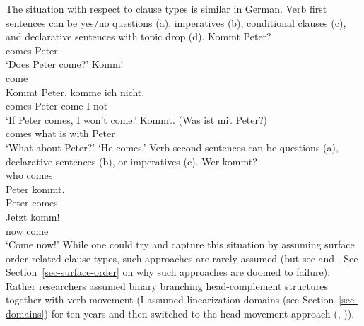 \documentclass[output=paper]{langsci/langscibook}
\begin{document}
The situation with respect to clause types is similar in German. Verb first sentences can be yes/no
questions (a), imperatives (b), conditional clauses (c), and declarative
sentences with topic drop (d). 
\eal
\ex 
\gll Kommt Peter?\\
     comes Peter\\\german
\glt `Does Peter come?'
\ex 
\gll Komm!\\
     come\\
\ex 
\gll Kommt Peter, komme ich nicht.\\
     comes Peter  come  I not\\
\glt `If Peter comes, I won't come.'
\ex 
\gll Kommt. (Was ist mit Peter?)\\
     comes  what is with Peter\\
\glt `What about Peter?' `He comes.'
\zl
Verb second sentences can be questions (a), declarative sentences (b), or imperatives (c).
\eal
\ex 
\gll Wer kommt?\\
     who comes\\
\ex 
\gll Peter kommt.\\
     Peter comes\\\german
\ex 
\gll Jetzt komm!\\
     now   come\\
\glt `Come now!'
\zl
While one could try and capture this situation by assuming surface order-related clause types, such approaches are rarely
assumed (but see  and . See Section~\ref{sec-surface-order} on why such approaches
are doomed to failure). Rather researchers assumed binary branching head-complement structures
together with verb movement (I assumed linearization domains (see Section~\ref{sec-domains}) for ten
years and then switched to the head-movement approach
(\citeauthor{Mueller2005c}, \citeyear*{Mueller2005c,Mueller2005d,MuellerGS})). 
\end{document}
